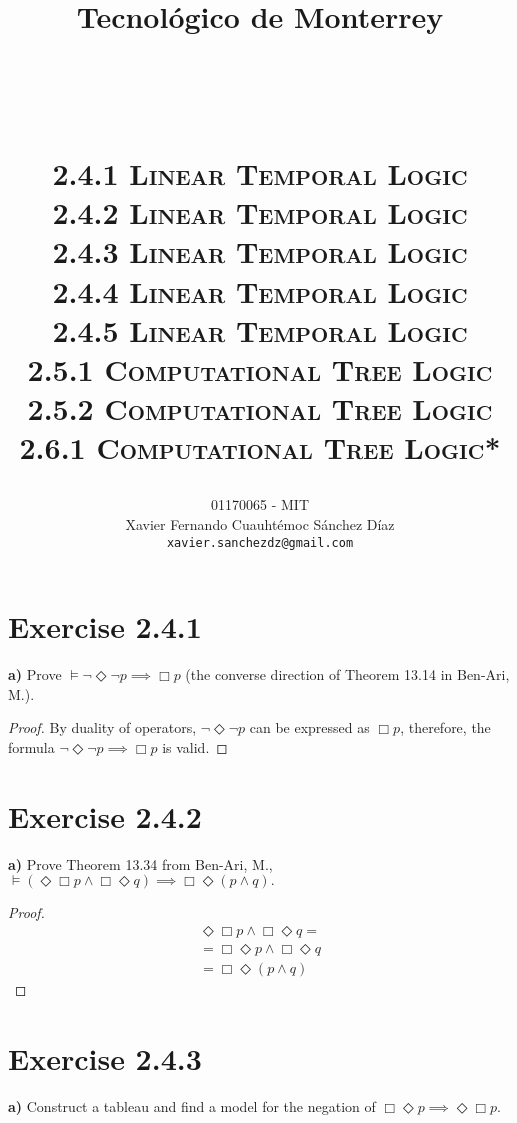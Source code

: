 \documentclass[titlepage, letterpaper, fleqn]{article}
\title{
\vspace{1in}
\textbf{Tecnológico de Monterrey} \\
\vspace{0.5in}
\textmd{\mahclass} \\
\large{\textit{\mahteacher}} \\
\vspace{0.5in}
\textsc{\mahtitle}\\
\textsc{2.4.1 Linear Temporal Logic}\\
\textsc{2.4.2 Linear Temporal Logic}\\
\textsc{2.4.3 Linear Temporal Logic}\\
\textsc{2.4.4 Linear Temporal Logic}\\
\textsc{2.4.5 Linear Temporal Logic}\\
\textsc{2.5.1 Computational Tree Logic}\\
\textsc{2.5.2 Computational Tree Logic}\\
\textsc{2.6.1 Computational Tree Logic*}\\
\author{01170065  - MIT \\
Xavier Fernando Cuauhtémoc Sánchez Díaz \\
\texttt{xavier.sanchezdz@gmail.com}}
\date{\mahdate}
}
\newcommand{\spacepls}{\vspace{5mm}}
\begin{document}
\begin{titlepage}
\maketitle
\end{titlepage}

%
%

\section{Exercise 2.4.1}

{\large \textbf{a)} Prove \(\models \neg \Diamond \neg p \implies \Box p\) (the converse direction of Theorem 13.14 in Ben-Ari, M.).}

\spacepls

\begin{proof}
By duality of operators, \(\neg \Diamond \neg p\) can be expressed as \(\Box p\), therefore, the formula \(\neg \Diamond \neg p \implies \Box p\) is valid.
\end{proof}

\section{Exercise 2.4.2}

{\large \textbf{a)} Prove Theorem 13.34 from Ben-Ari, M., \(\models (\Diamond \Box p \wedge \Box \Diamond q) \implies \Box \Diamond(p \wedge q).\)}

\spacepls

\begin{proof}
\begin{align*}
& \Diamond \Box p \wedge \Box \Diamond q = & \\
& = \Box \Diamond p \wedge \Box \Diamond q & \tag*{Commutativity of $\Diamond \Box$} \\
& = \Box \Diamond (p \wedge q) & \tag*{$\Box \, \& \, \Diamond$ distribute over $\wedge$}
\end{align*}
\end{proof}

\section{Exercise 2.4.3}

{\large \textbf{a)} Construct a tableau and find a model for the negation of \(\Box \Diamond p \implies \Diamond \Box p\).}

\spacepls
\end{document}

